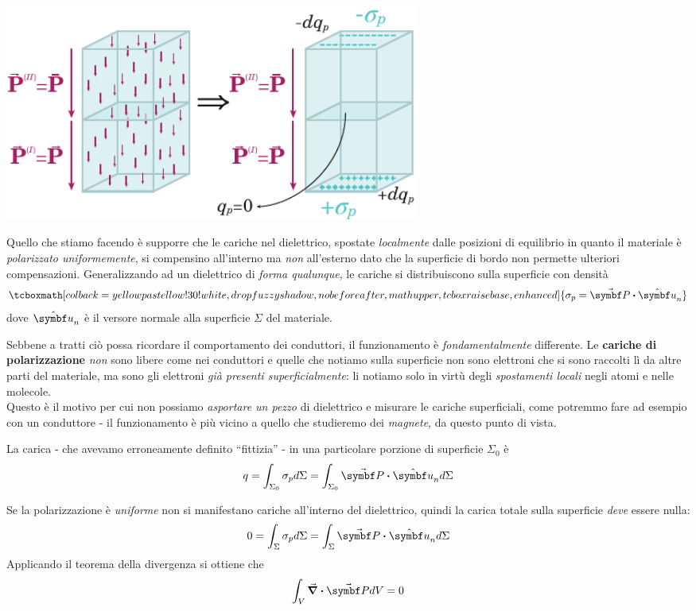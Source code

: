 \begin{center}
	\includegraphics[width=0.6\textwidth]{images/chp6/chp6caricapolari2.pdf}
\end{center}
Quello che stiamo facendo è supporre che le cariche nel dielettrico, spostate \textit{localmente} dalle posizioni di equilibrio in quanto il materiale è \textit{polarizzato uniformemente}, si compensino all'interno ma \textit{non} all'esterno dato che la superficie di bordo non permette ulteriori compensazioni. Generalizzando ad un dielettrico di \textit{forma qualunque}, le cariche si distribuiscono sulla superficie con densità
\begin{equation}
	\tcboxmath[colback=yellowpastellow!30!white,drop fuzzy shadow, nobeforeafter, math upper, tcbox raise base, enhanced]{\sigma_p=\vba{P}\vdot \vbh{u}_n}
\end{equation}
dove $\vbh{u}_n$ è il versore normale alla superficie $\Sigma$ del materiale.
\begin{attention}
	Sebbene a tratti ciò possa ricordare il comportamento dei conduttori, il funzionamento è \textit{fondamentalmente} differente. Le \textbf{cariche di polarizzazione} \textit{non} sono libere come nei conduttori e quelle che notiamo sulla superficie non sono elettroni che si sono raccolti lì da altre parti del materiale, ma sono gli elettroni \textit{già presenti superficialmente}: li notiamo solo in virtù degli \textit{spostamenti locali} negli atomi e nelle molecole.\\
	Questo è il motivo per cui non possiamo \textit{asportare un pezzo} di dielettrico e misurare le cariche superficiali, come potremmo fare ad esempio con un conduttore - il funzionamento è più vicino a quello che studieremo dei \textit{magnete}, da questo punto di vista.
\end{attention}
\noindent La carica - che avevamo erroneamente definito ``fittizia'' - in una particolare porzione di superficie $\Sigma_0$ è
\begin{equation}
	q=\int_{\Sigma_0}\sigma_pd\Sigma=\int_{\Sigma_0}\vba{P}\vdot \vbh{u}_nd\Sigma
	\end{equation}
\begin{observe}
	Se la polarizzazione è \textit{uniforme} non si manifestano cariche all'interno del dielettrico, quindi la carica totale sulla superficie \textit{deve} essere nulla:
	\begin{equation*}
		0=\int_{\Sigma} \sigma_p d\Sigma=\int_\Sigma \vba{P}\vdot\vbh{u}_nd\Sigma
	\end{equation*}
	Applicando il teorema della divergenza si ottiene che
	\begin{equation}
		\int_{V}\div{\vba{P}}dV=0
	\end{equation}
\end{observe}

